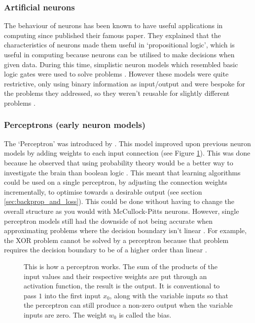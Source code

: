 \documentclass[12pt]{article}
\newcommand{\vectorimage}[1]{
    \def\svgwidth{5.5in}
    {#1.pdf_tex}
}
\begin{document}
	\subsubsection{Artificial neurons}
	\label{sec:artificial_neurons}
	
	The behaviour of neurons has been known to have useful applications in computing since  \textcite{McCullock_Pitts} published their famous paper. They explained that the characteristics of neurons made them useful in `propositional logic', which is useful in computing because neurons can be utilised to make decisions when given data. During this time, simplistic neuron models which resembled basic logic gates were used to solve problems \parencite[p.99]{McCullock_Pitts}. However these models were quite restrictive, only using binary information as input/output and were bespoke for the problems they addressed, so they weren't reusable for slightly different problems \parencite[p.29-33]{Rojas}.
	
	\subsubsection{Perceptrons (early neuron models)}
	\label{sec:perceptron}
	
	The `Perceptron' was introduced by \textcite{Rosenblatt}. This model improved upon previous neuron models by adding weights to each input connection (see Figure \ref{fig:perceptron}). This was done because he observed that using probability theory would be a better way to investigate the brain than boolean logic \parencite[p387-388]{Rosenblatt}. This meant that learning algorithms could be used on a single perceptron, by adjusting the connection weights incrementally, to optimise towards a desirable output (see section \ref{sec:backprop_and_loss}). This could be done without having to change the overall structure as you would with McCullock-Pitts neurons. However, single perceptron models still had the downside of not being accurate when approximating problems where the decision boundary isn't linear \parencite{Raschka}. For example, the XOR problem cannot be solved by a perceptron because that problem requires the decision boundary to be of a higher order than linear \parencite[p.124-127]{Rojas}.\medskip
    
    \begin{figure}[h!]
        \centering
        \fbox{\vectorimage{perceptron}}
        \caption{This is how a perceptron works. The sum of the products of the input values and their respective weights are put through an activation function, the result is the output. It is conventional to pass $1$ into the first input $x_0$, along with the variable inputs so that the perceptron can still produce a non-zero output when the variable inputs are zero. The weight $w_0$ is called the bias.}
        \label{fig:perceptron}
    \end{figure}
    
\end{document}
